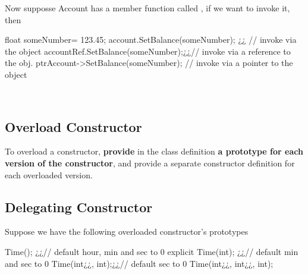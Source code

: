 \noindent Now supposse Account has a member function called , if we want to invoke it, then\\
\begin{minipage}{\MPWxLARGExLISTING\textwidth} %
{} %
\begin{CPPCode}
float someNumber= 123.45;
account.SetBalance(someNumber); ¿\hspace{0.55cm}¿ // invoke via the object
accountRef.SetBalance(someNumber);¿\hspace{0.37cm}¿// invoke via a reference to the obj.
ptrAccount->SetBalance(someNumber); // invoke via a pointer to the object
\end{CPPCode}
\end{minipage}\\

\subsection{Overload Constructor}
To overload a constructor, \textbf{provide} in the class definition \textbf{a prototype for each version of the constructor}, and provide a separate constructor definition for each overloaded version.

\subsection{Delegating Constructor}
Suppose we have the following overloaded constructor's prototypes\\
\begin{minipage}{\MPWxLARGExLISTING\textwidth} %
{} %
\begin{CPPCode}
Time(); ¿\hspace{2.15cm}¿// default hour, min and sec to 0
explicit Time(int); ¿\hspace{0.15cm}¿// default min and sec to 0
Time(int¿¿, int);¿\hspace{0.92cm}¿// default sec to 0
Time(int¿¿, int¿¿, int);
\end{CPPCode}
\end{minipage}\\

